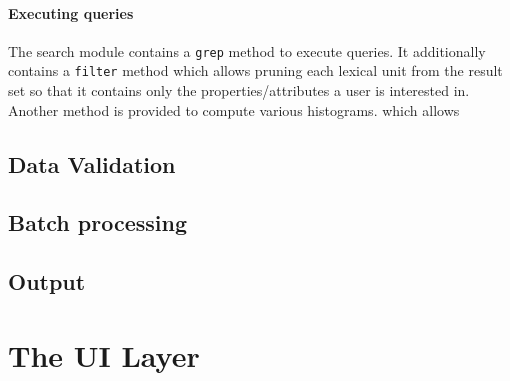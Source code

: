 \documentclass[10pt, a4paper, twocolumn]{article} %
\newcommand{\py}[1]{{\tt #1}}
\begin{document}
\paragraph{Executing queries}
The search module contains a \py{grep} method to execute queries. It additionally contains a \py{filter}
method which allows pruning each lexical unit from the result set so that it contains only the properties/attributes a user is interested in. Another method is provided to compute various histograms.
which allows




\subsection{Data Validation}
\subsection{Batch processing}
\subsection{Output}


\section{The UI Layer}
\end{document}
